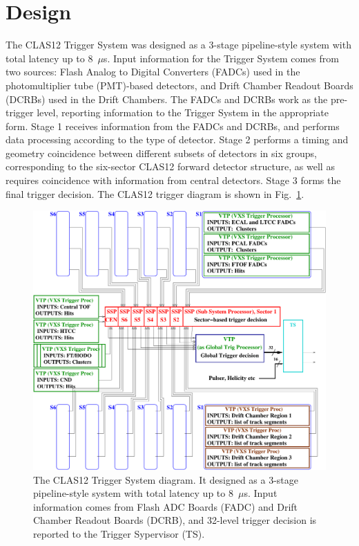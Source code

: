 \section{Design}

The CLAS12 Trigger System was designed as a 3-stage pipeline-style system with total latency up to 8~$\mu$s. Input information for the Trigger System comes from two sources:  Flash Analog to Digital Converters (FADCs) used in the photomultiplier tube (PMT)-based detectors, and Drift Chamber Readout Boards (DCRBs) used in the Drift Chambers. The FADCs and DCRBs work as the pre-trigger level, reporting information to the Trigger System in the appropriate form. Stage 1 receives information from the FADCs and DCRBs, and performs data processing according to the type of detector. Stage 2 performs a timing and geometry coincidence between different subsets of detectors in six groups, corresponding to the six-sector CLAS12 forward detector structure, as well as requires coincidence with information from central detectors. Stage 3 forms the final trigger decision. The CLAS12 trigger diagram is shown in Fig.~\ref{fig:TriggerDiagram}.

\begin{figure}[hbt]
	\centering
	\includegraphics[width=1.0\columnwidth,keepaspectratio]{img/CLAS12_TRIGGER_1.pdf}
	\caption{The CLAS12 Trigger System diagram. It designed as a 3-stage pipeline-style system with total latency up to 8~$\mu$s. Input information comes from Flash ADC Boards (FADC) and Drift Chamber Readout Boards (DCRB), and 32-level trigger decision is reported to the Trigger Sypervisor (TS). }
	\label{fig:TriggerDiagram}
\end{figure}


